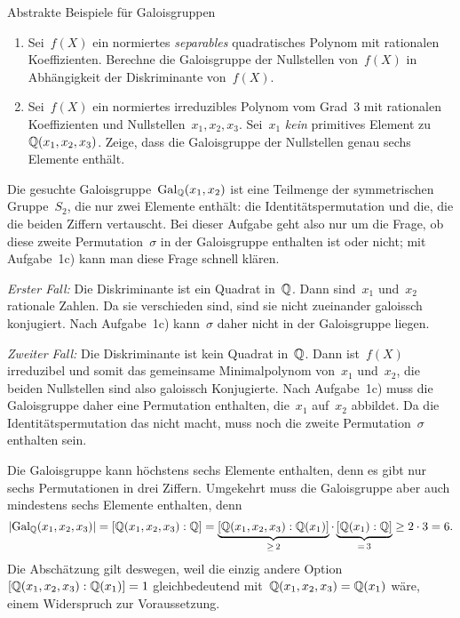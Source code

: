 \documentclass{algblatt}
\begin{document}
\begin{aufgabe}{Abstrakte Beispiele für Galoisgruppen}
\begin{enumerate}
\item Sei~$f(X)$ ein normiertes \emph{separables} quadratisches Polynom mit rationalen
Koeffizienten.
Berechne die Galoisgruppe der Nullstellen von~$f(X)$ in Abhängigkeit der Diskriminante
von~$f(X)$.

\item Sei~$f(X)$ ein normiertes irreduzibles Polynom vom Grad~$3$ mit
rationalen Koeffizienten und Nullstellen~$x_1,x_2,x_3$. Sei~$x_1$ \emph{kein}
primitives Element zu~$\mathbb{Q}(x_1,x_2,x_3)$. Zeige, dass die Galoisgruppe der
Nullstellen genau sechs Elemente enthält.
\end{enumerate}

\begin{loesungE}
\item Die gesuchte Galoisgruppe~$\mathrm{Gal}_{\mathbb{Q}}(x_1,x_2)$ ist eine Teilmenge der
symmetrischen Gruppe~$S_2$, die nur zwei Elemente enthält: die
Identitätspermutation und die, die die beiden Ziffern vertauscht. Bei dieser
Aufgabe geht also nur um die Frage, ob diese zweite Permutation~$\sigma$ in der
Galoisgruppe enthalten ist oder nicht; mit Aufgabe~1c) kann man diese Frage
schnell klären.

\emph{Erster Fall:} Die Diskriminante ist ein Quadrat in~$\mathbb{Q}$. Dann sind~$x_1$
und~$x_2$ rationale Zahlen. Da sie verschieden sind, sind sie nicht zueinander
galoissch konjugiert. Nach Aufgabe~1c) kann~$\sigma$ daher nicht in der
Galoisgruppe liegen.

\emph{Zweiter Fall:} Die Diskriminante ist kein Quadrat in~$\mathbb{Q}$. Dann
ist~$f(X)$ irreduzibel und somit das gemeinsame Minimalpolynom von~$x_1$
und~$x_2$, die beiden Nullstellen sind also galoissch Konjugierte. Nach
Aufgabe~1c) muss die Galoisgruppe daher eine Permutation enthalten, die~$x_1$
auf~$x_2$ abbildet. Da die Identitätspermutation das nicht macht, muss noch
die zweite Permutation~$\sigma$ enthalten sein.

\item Die Galoisgruppe kann höchstens sechs Elemente enthalten, denn es gibt
nur sechs Permutationen in drei Ziffern. Umgekehrt muss die Galoisgruppe aber
auch mindestens sechs Elemente enthalten, denn
\[ |\mathrm{Gal}_{\mathbb{Q}}(x_1,x_2,x_3)| = [\mathbb{Q}(x_1,x_2,x_3):\mathbb{Q}] =
  \underbrace{[\mathbb{Q}(x_1,x_2,x_3):\mathbb{Q}(x_1)]}_{\geq\,2} \cdot
  \underbrace{[\mathbb{Q}(x_1):\mathbb{Q}]}_{=\,3} \geq
  2 \cdot 3 = 6. \]
Die Abschätzung gilt deswegen, weil die einzig andere
Option~$[\mathbb{Q}(x_1,x_2,x_3):\mathbb{Q}(x_1)] = 1$ gleichbedeutend
mit~$\mathbb{Q}(x_1,x_2,x_3) = \mathbb{Q}(x_1)$ wäre, einem Widerspruch zur Voraussetzung.
\end{loesungE}
\end{aufgabe}
\end{document}
